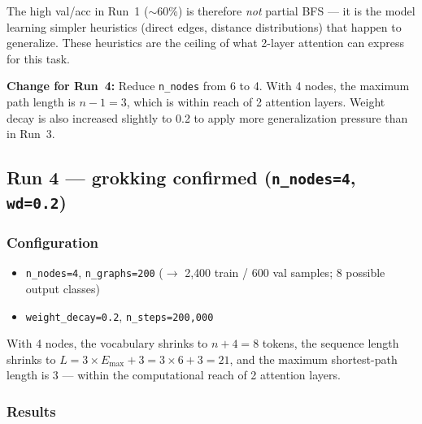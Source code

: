 \documentclass[11pt, a4paper]{article}
\begin{document}
The high val/acc in Run~1 ($\sim$60\%) is therefore \emph{not} partial
BFS --- it is the model learning simpler heuristics (direct edges, distance
distributions) that happen to generalize. These heuristics are the ceiling of
what 2-layer attention can express for this task.

\textbf{Change for Run~4:} Reduce \texttt{n\_nodes} from 6 to 4. With 4
nodes, the maximum path length is $n - 1 = 3$, which is within reach of 2
attention layers. Weight decay is also increased slightly to 0.2 to apply
more generalization pressure than in Run~3.

\subsection{Run 4 --- grokking confirmed (\texttt{n\_nodes=4}, \texttt{wd=0.2})}

\subsubsection{Configuration}

\begin{itemize}[noitemsep]
  \item \texttt{n\_nodes=4}, \texttt{n\_graphs=200}
        ($\to$ 2{,}400 train / 600 val samples; 8 possible output classes)
  \item \texttt{weight\_decay=0.2}, \texttt{n\_steps=200{,}000}
\end{itemize}

With 4 nodes, the vocabulary shrinks to $n + 4 = 8$ tokens, the sequence
length shrinks to $L = 3 \times E_{\max} + 3 = 3 \times 6 + 3 = 21$, and the
maximum shortest-path length is 3 --- within the computational reach of 2
attention layers.

\subsubsection{Results}
\end{document}
